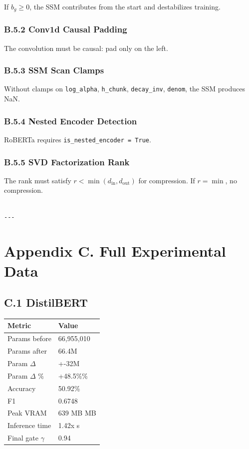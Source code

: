 If $b_g \geq 0$, the SSM contributes from the start and destabilizes training.

\subsubsection{B.5.2 Conv1d Causal Padding}

The convolution must be causal: pad only on the left.

\subsubsection{B.5.3 SSM Scan Clamps}

Without clamps on \texttt{log\_alpha}, \texttt{h\_chunk}, \texttt{decay\_inv}, \texttt{denom}, the SSM 
produces NaN.

\subsubsection{B.5.4 Nested Encoder Detection}

RoBERTa requires \texttt{is\_nested\_encoder = True}.

\subsubsection{B.5.5 SVD Factorization Rank}

The rank must satisfy $r < \min(d_\text{in}, d_\text{out})$ for 
compression. If $r = \min$, no compression.
\begin{lstlisting}

---
\end{lstlisting}


\section{Appendix C. Full Experimental Data}

\subsection{C.1 DistilBERT}

\begin{table}[H]
\centering
\small
\begin{tabular}{ll}
\toprule
\textbf{Metric} & \textbf{Value} \\
\midrule
Params before & 66,955,010 \\
Params after & 66.4M \\
Param $\Delta$ & +-32M \\
Param $\Delta$ \% & +48.5\%\% \\
Accuracy & 50.92\% \\
F1 & 0.6748 \\
Peak VRAM & 639 MB MB \\
Inference time & 1.42x s \\
Final gate $\gamma$ & 0.94 \\
\bottomrule
\end{tabular}
\end{table}

